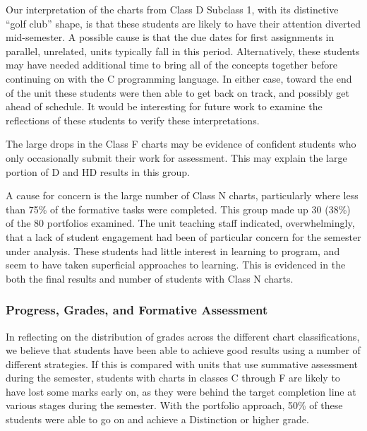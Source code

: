 Our interpretation of the charts from Class D Subclass 1, with its distinctive ``golf club'' shape, is that these students are likely to have their attention diverted mid-semester. A possible cause is that the due dates for first assignments in parallel, unrelated, units typically fall in this period. Alternatively, these students may have needed additional time to bring all of the concepts together before continuing on with the C programming language. In either case, toward the end of the unit these students were then able to get back on track, and possibly get ahead of schedule. It would be interesting for future work to examine the reflections of these students to verify these interpretations.

The large drops in the Class F charts may be evidence of confident students who only occasionally submit their work for assessment. This may explain the large portion of D and HD results in this group.

A cause for concern is the large number of Class N charts, particularly where less than 75\% of the formative tasks were completed. This group made up 30 (38\%) of the 80 portfolios examined. The unit teaching staff indicated, overwhelmingly, that a lack of student engagement had been of particular concern for the semester under analysis. These students had little interest in learning to program, and seem to have taken superficial approaches to learning. This is evidenced in the both the final results and number of students with Class N charts.



\subsubsection{Progress, Grades, and Formative Assessment} %
\label{sub:progress_grades_and_formative_assessment}

In reflecting on the distribution of grades across the different chart classifications, we believe that students have been able to achieve good results using a number of different strategies. If this is compared with units that use summative assessment during the semester, students with charts in classes C through F are likely to have lost some marks early on, as they were behind the target completion line at various stages during the semester. With the portfolio approach, 50\% of these students were able to go on and achieve a Distinction or higher grade.

